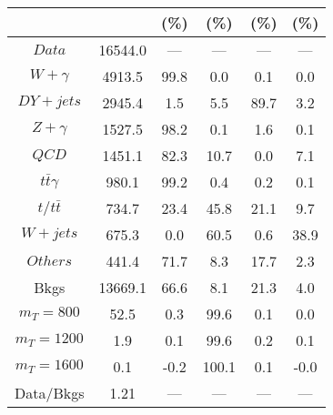 \begin{figure}
\begin{minipage}[c]{0.32\textwidth}
{\begin{tabular}{cccccc}
 &  & (\%) & (\%) & (\%) & (\%)  \\
\hline
                                                                      $ Data $ &  16544.0 &  --- &  --- &  --- &  ---\\
$ W+\gamma $ &  4913.5 &  99.8 &  0.0 &  0.1 &  0.0\\
$ DY+jets $ &  2945.4 &  1.5 &  5.5 &  89.7 &  3.2\\
$ Z+\gamma $ &  1527.5 &  98.2 &  0.1 &  1.6 &  0.1\\
$ QCD $ &  1451.1 &  82.3 &  10.7 &  0.0 &  7.1\\
$ t\bar{t}\gamma $ &  980.1 &  99.2 &  0.4 &  0.2 &  0.1\\
$ t/t\bar{t} $ &  734.7 &  23.4 &  45.8 &  21.1 &  9.7\\
$ W+jets $ &  675.3 &  0.0 &  60.5 &  0.6 &  38.9\\
$ Others $ &  441.4 &  71.7 &  8.3 &  17.7 &  2.3\\
Bkgs &  13669.1 &  66.6 &  8.1 &  21.3 &  4.0\\
$ m_{T} = 800 $ &  52.5 &  0.3 &  99.6 &  0.1 &  0.0\\
$ m_{T} = 1200 $ &  1.9 &  0.1 &  99.6 &  0.2 &  0.1\\
$ m_{T} = 1600 $ &  0.1 &  -0.2 &  100.1 &  0.1 &  -0.0\\
Data/Bkgs &  1.21 &  --- &  --- &  --- &  ---\\
\hline
\end{tabular}
}
\end{minipage}
\end{figure}

